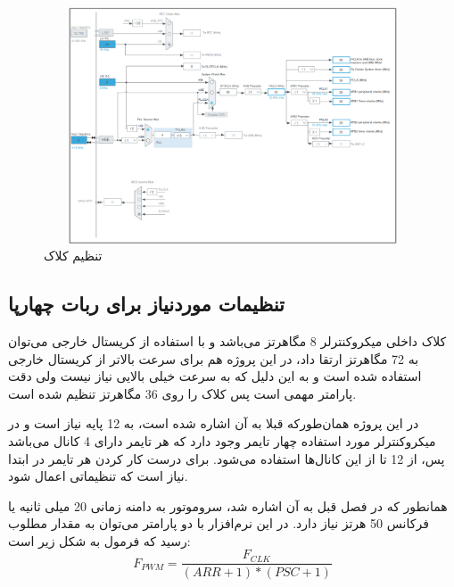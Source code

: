     \begin{figure}[!h]
	\centering
	\includegraphics[height=7cm,width=12cm]{./Images/CH4/CubeMX_1.PNG}
	\caption[تنظیم کلاک]{تنظیم کلاک}
	\label{تنظیم کلاک}
	\end{figure}

\vspace{1cm}
\subsection{تنظیمات موردنیاز برای ربات چهارپا}
کلاک داخلی میکروکنترلر 8 مگاهرتز می‌باشد و با استفاده از کریستال خارجی می‌توان به 72 مگاهرتز ارتقا داد، در این پروژه هم برای سرعت بالاتر از کریستال خارجی استفاده شده است و به این دلیل که به سرعت خیلی بالایی نیاز نیست ولی دقت پارامتر مهمی است پس کلاک را روی 36 مگاهرتز تنظیم شده است.

در این پروژه همان‌طورکه قبلا به آن اشاره شده است، به 12 پایه  نیاز است و در میکروکنترلر مورد استفاده چهار تایمر وجود دارد که هر تایمر دارای 4 کانال می‌باشد پس، از 12 تا از این کانال‌ها استفاده می‌شود. برای درست کار کردن هر تایمر در ابتدا نیاز است که تنظیماتی اعمال شود.

همانطور که در فصل قبل به آن اشاره شد، سروموتور به دامنه زمانی 20 میلی ثانیه یا فرکانس 50 هرتز نیاز دارد. در این نرم‌افزار با دو پارامتر می‌توان به مقدار مطلوب رسید که فرمول به شکل زیر است:
\begin{equation}
	F_{PWM} = \frac{F_{CLK}}{(ARR + 1)*(PSC + 1)}
\end{equation}

